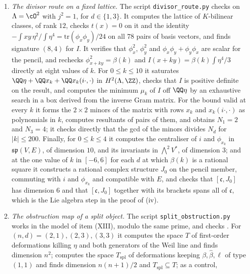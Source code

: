 \begin{enumerate}[label=\textup{(\Roman*)},leftmargin=*]
  index $2(a_{1}a_{2})^{2}$ throughout.
\item \emph{The divisor route on a fixed lattice.} The script
  \texttt{divisor\_\allowbreak route.py} checks  on
  $\Lambda=\cO^{2}$ with $j^{2}=1$, for $d\in\{1,3\}$. It computes the
  lattice of $K$-bilinear classes, of rank $12$, checks $t(x)=0$ on it and the
  identity $-\int xy\,\eta^{2}\big/\!\int\eta^{4}=\mathrm{tr}(\phi_{x}\phi_{y})/24$
  on all $78$ pairs of basis vectors, and finds signature $(8,4)$ for $I$. It
  verifies that $\phi_{x}^{2}$, $\phi_{y}^{2}$ and
  $\phi_{x}\phi_{y}+\phi_{y}\phi_{x}$ are scalar for the pencil, and
  rechecks $\phi_{x+ky}^{2}=\beta(k)$ and $I(x+ky)=\beta(k)\int\eta^{4}/3$
  directly at eight values of $k$. For $0\le k\le10$ it saturates
  $\QQ\eta+\QQ x_{k}+\QQ x_{k}(i\cdot,\cdot)$ in $H^{2}(\Lambda,\ZZ)$,
  checks that $I$ is positive definite on the result, and computes the
  minimum $\mu_{k}$ of $I$ off $\QQ\eta$ by an exhaustive search in a box
  derived from the inverse Gram matrix. For the bound valid at every $k$ it
  forms the $2\times2$ minors of the matrix with rows $x_{k}$ and
  $x_{k}(i\cdot,\cdot)$ as polynomials in $k$, computes resultants of pairs of
  them, and obtains $N_{1}=2$ and $N_{3}=4$; it checks directly that the gcd of
  the minors divides $N_{d}$ for $|k|\le200$. Finally, for $0\le k\le4$ it
  computes the centraliser of $i$ and $\phi_{x_{k}}$ in $\mathfrak{sp}(V,E)$,
  of dimension $10$, and its invariants in $\bigwedge^{2}V^{*}$, of dimension
  $3$; and at the one value of $k$ in $[-6,6]$ for each $d$ at which
  $\beta(k)$ is a rational square it constructs a rational complex structure
  $J_{0}$ on the pencil member, commuting with $i$ and $\phi_{x_{k}}$ and
  compatible with $E$, and checks that $[\mathfrak{c},J_{0}]$ has dimension
  $6$ and that $[\mathfrak{c},J_{0}]$ together with its brackets spans all of
  $\mathfrak{c}$, which is the Lie algebra step in the proof of
  (iv).
\item \emph{The obstruction map of a split object.} The script
  \texttt{split\_\allowbreak obstruction.py} works in the model of item
  (XIII), modulo the same prime, and checks .
  For $(n,d)=(2,1),(2,3),(3,3)$ it computes the space $T$ of first-order
  deformations killing $\eta$ and both generators of the Weil line and
  finds dimension $n^{2}$; computes the space $T_{\mathrm{spl}}$ of
  deformations keeping $\beta,\widehat\beta,\ell$ of type $(1,1)$ and finds
  dimension $n(n+1)/2$ and $T_{\mathrm{spl}}\subseteq T$; as a control,

\end{enumerate}

